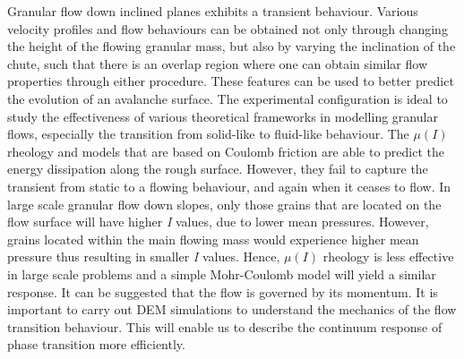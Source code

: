 Granular flow down inclined planes exhibits a transient behaviour. Various 
velocity profiles and flow behaviours can be obtained not only through changing 
the height of the flowing granular mass, but also by varying the inclination of 
the chute, such that there is an overlap region where one can obtain similar 
flow properties through either procedure. These features can be used to better 
predict the evolution of an avalanche surface. The experimental configuration 
is ideal to study the effectiveness of various theoretical frameworks in 
modelling granular flows, especially the transition from solid-like to 
fluid-like behaviour. The $\mu(I)$ rheology and models 
that are based on Coulomb friction are able to predict the energy dissipation 
along the rough surface. However, they fail to capture the transient from 
static to a flowing behaviour, and again when it ceases to flow. 
In large scale granular flow down slopes, only those grains that are
located on the flow surface will have higher \textit{I} values, due to lower 
mean pressures. However, grains located within the main flowing mass would 
experience higher mean pressure thus resulting in smaller \textit{I} 
values. Hence, $\mu(I)$ rheology is less effective in large scale problems and 
a simple Mohr-Coulomb model will yield a similar response. It can be 
suggested that the flow is governed by its momentum. It is 
important to carry out DEM simulations to understand the mechanics of the flow 
transition behaviour. This will enable us to describe the continuum response of 
phase transition more efficiently.


